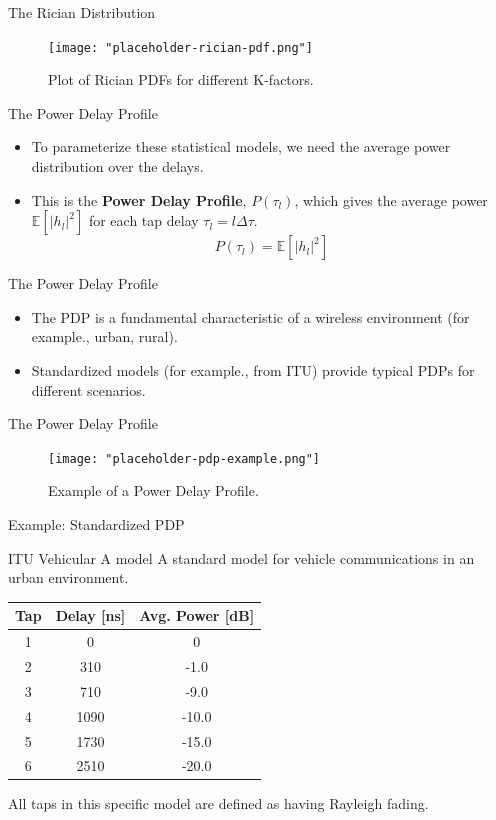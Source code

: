\documentclass{beamer}
\begin{document}
	\begin{frame}{The Rician Distribution}
		\begin{figure}
			\centering
			\texttt{[image: "placeholder-rician-pdf.png"]}
			\caption{Plot of Rician PDFs for different K-factors.}
		\end{figure}
	\end{frame}
	
	\begin{frame}{The Power Delay Profile}
		\begin{itemize}
			\item To parameterize these statistical models, we need the average power distribution over the delays.
			
			\item This is the \textbf{Power Delay Profile}, $P(\tau_l)$, which gives the average power $\mathbb{E}[|h_l|^2]$ for each tap delay $\tau_l = l\Delta\tau$.
			\[ P(\tau_l) = \mathbb{E}[|h_l|^2] \]
		\end{itemize}
	\end{frame}
	
	\begin{frame}{The Power Delay Profile}
		\begin{itemize}
			\item The PDP is a fundamental characteristic of a wireless environment (for example., urban, rural). 
			\item Standardized models (for example., from ITU) provide typical PDPs for different scenarios.
		\end{itemize}
	\end{frame}
	
	\begin{frame}{The Power Delay Profile}
		\begin{figure}
			\centering
			\texttt{[image: "placeholder-pdp-example.png"]}
			\caption{Example of a Power Delay Profile.}
		\end{figure}
	\end{frame}
	
	\begin{frame}{Example: Standardized PDP}
		\begin{block}{ITU Vehicular A model}
			A standard model for vehicle communications in an urban environment.
			\begin{center}
				\begin{tabular}{ccc}
					\toprule
					Tap & Delay [ns] & Avg. Power [dB] \\
					\midrule
					1 & 0 & 0 \\
					2 & 310 & -1.0 \\
					3 & 710 & -9.0 \\
					4 & 1090 & -10.0 \\
					5 & 1730 & -15.0 \\
					6 & 2510 & -20.0 \\
					\bottomrule
				\end{tabular}
			\end{center}
			All taps in this specific model are defined as having Rayleigh fading.
		\end{block}
	\end{frame}
	
\end{document}
